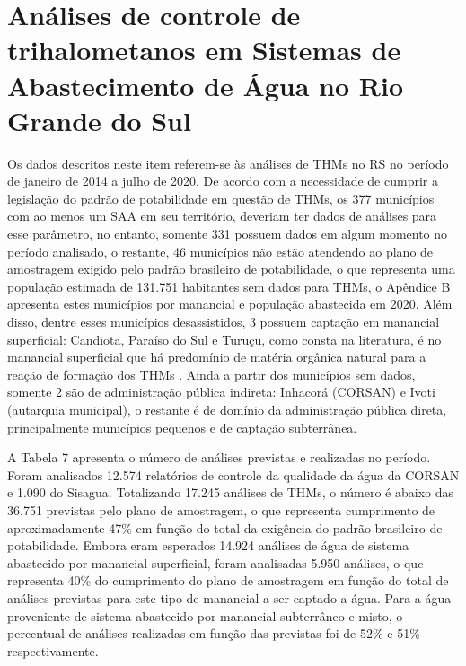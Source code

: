 \section{Análises de controle de trihalometanos em Sistemas de Abastecimento de Água no Rio Grande do Sul}


Os dados descritos neste item referem-se às análises de THMs no RS no período de janeiro de 2014 a julho de 2020. De acordo com a necessidade de cumprir a legislação do padrão de potabilidade em questão de THMs, os 377 municípios com ao menos um SAA em seu território, deveriam ter dados de análises para esse parâmetro, no entanto, somente 331 possuem dados em algum momento no período analisado, o restante, 46 municípios não estão atendendo ao plano de amostragem exigido pelo padrão brasileiro de potabilidade, o que representa uma população estimada de 131.751 habitantes sem dados para THMs, o Apêndice B apresenta estes municípios por manancial e população abastecida em 2020. Além disso, dentre esses municípios desassistidos, 3 possuem captação em manancial superficial: Candiota,  Paraíso  do  Sul  e  Turuçu,  como  consta  na  literatura,  é  no  manancial superficial que há predomínio de matéria orgânica natural para a reação de formação dos THMs \cite{Abbas2014}. Ainda a partir dos municípios sem dados, somente 2 são de administração pública indireta: Inhacorá (CORSAN) e Ivoti (autarquia municipal), o restante é de domínio da administração pública direta, principalmente municípios pequenos e de captação subterrânea.


 A Tabela 7 apresenta o número de análises previstas e realizadas no período. Foram analisados 12.574 relatórios de controle da qualidade da água da CORSAN e 1.090 do Sisagua. Totalizando 17.245 análises de THMs, o número é abaixo das 36.751 previstas pelo plano de amostragem, o que representa cumprimento de aproximadamente 47\% em função do total da exigência do padrão brasileiro de potabilidade. Embora eram esperados 14.924 análises de água de sistema abastecido por manancial superficial, foram analisadas 5.950 análises, o que representa 40\% do cumprimento do plano de amostragem em função do total de análises previstas para este tipo de manancial a ser captado a água. Para a água proveniente de sistema abastecido por manancial subterrâneo e misto, o percentual de análises realizadas em função das previstas foi de 52\% e 51\% respectivamente.

